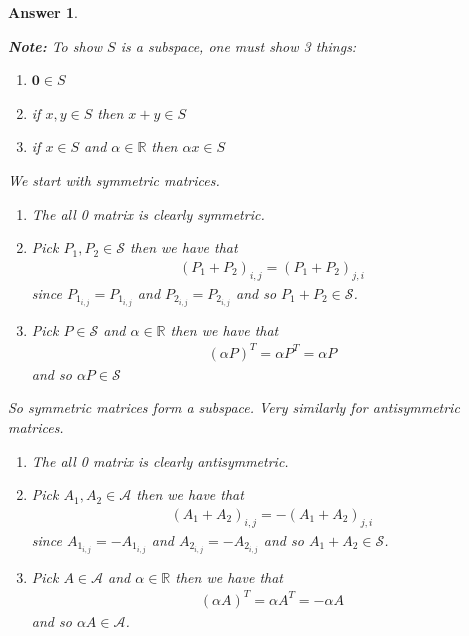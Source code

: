 \documentclass[12pt]{article}
\theoremstyle{colon}
\newtheorem*{answer}{Answer}
\begin{document}
\begin{answer}
  \
  
  \textbf{Note: } To show $S$ is a subspace, one must show 3 things:
  \begin{enumerate}[label=\roman*)]
    \item $\bm{0} \in S$
    \item if $x, y \in S$ then $x + y \in S$
    \item if $x \in S$ and $\alpha \in \mathbb{R}$ then $\alpha x \in S$
  \end{enumerate}

  We start with symmetric matrices.

  \begin{enumerate}[label=\roman*)]
    \item The all 0 matrix is clearly symmetric.
    \item Pick $P_1, P_2 \in \mathcal{S}$ then we have that
      \begin{gather*}
        (P_1 + P_2)_{i,j} = (P_1 + P_2)_{j,i}
      \end{gather*}
      since $P_{1_{i,j}} = P_{1_{i,j}}$ and $P_{2_{i,j}} = P_{2_{i,j}}$ and so $P_1 + P_2 \in \mathcal{S}$.
    \item Pick $P \in \mathcal{S}$ and $\alpha \in \mathbb{R}$ then we have that
      \begin{gather*}
        (\alpha P)^T = \alpha P^T = \alpha P
      \end{gather*}
      and so $\alpha P \in \mathcal{S}$
  \end{enumerate}

  So symmetric matrices form a subspace. Very similarly for antisymmetric matrices.

  \begin{enumerate}[label=\roman*)]
    \item The all 0 matrix is clearly antisymmetric.
    \item Pick $A_1, A_2 \in \mathcal{A}$ then we have that
      \begin{gather*}
        (A_1 + A_2)_{i,j} = -(A_1 + A_2)_{j,i}
      \end{gather*}
      since $A_{1_{i,j}} = -A_{1_{i,j}}$ and $A_{2_{i,j}} = -A_{2_{i,j}}$ and so $A_1 + A_2 \in \mathcal{S}$.
    \item Pick $A \in \mathcal{A}$ and $\alpha \in \mathbb{R}$ then we have that
      \begin{gather*}
        (\alpha A)^T = \alpha A^T = -\alpha A
      \end{gather*}
      and so $\alpha A \in \mathcal{A}$.
  \end{enumerate}


\end{answer}
\end{document}
